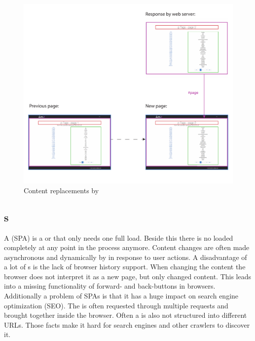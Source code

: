 \begin{figure}[H]
\centering
\includegraphics[width=12cm]{images/ajax_replacements.pdf}
\caption[ajax_replacements]{Content replacements by \ajax{}}
\label{fig:ajax_replacements}
\end{figure}

\subsection{\SinglePageApplication{}s\label{singlePageApplication}}
A \singlePageApplication{} (SPA) is a \webApplication{} or \webSite{} that only needs one full \webPage{} load.
Beside this there is no \webPage{} loaded completely at any point in the process anymore.
Content changes are often made asynchronous and dynamically by \ajax{} in response to user actions.
A disadvantage of a lot of \singlePageApplication{}s is the lack of browser history support.
When changing the content the browser does not interpret it as a new page, but only changed content.
This leads into a missing functionality of forward- and back-buttons in browsers.
\\
Additionally a problem of SPAs is that it has a huge impact on search engine optimization (SEO).
The \webPage{} is often requested through multiple requests and brought together inside the browser. Often a \webSite{} is also not structured into different URLs.
Those facts make it hard for search engines and other crawlers to discover it.

